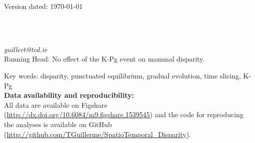 \documentclass[12pt,letterpaper]{article}
\begin{document}
\begin{flushright}
Version dated: \today
\end{flushright}
\bigskip
\begin{center}

\bigskip

\\
\\
\end{center}
\medskip
{} \textit{guillert@tcd.ie}\\  

\bigskip
\noindent Running Head: No effect of the K-Pg event on mammal disparity.

\bigskip
\noindent Key words: disparity, punctuated equilibrium, gradual evolution, time slicing, K-Pg\\

\bigskip
\noindent \textbf{Data availability and reproducibility:}\\
\noindent All data are available on Figshare (\url{http://dx.doi.org/10.6084/m9.figshare.1539545}) and the code for reproducing the analyses is available on GitHub (\url{http://github.com/TGuillerme/SpatioTemporal_Disparity}). %


\modulolinenumbers[1]
\linenumbers



\end{document}
